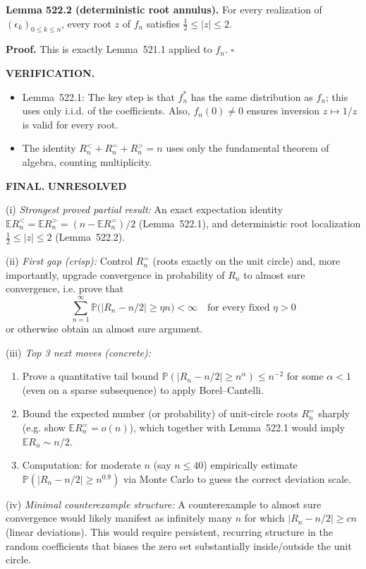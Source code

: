 \medskip
\noindent\textbf{Lemma 522.2 (deterministic root annulus).}
For every realization of $(\epsilon_k)_{0\le k\le n}$, every root $z$ of $f_n$ satisfies $\tfrac12\le |z|\le 2$.

\noindent\textbf{Proof.}
This is exactly Lemma~521.1 applied to $f_n$.
\hfill$\square$

\bigskip
\noindent\textbf{VERIFICATION.}
\begin{itemize}
\item Lemma~522.1: The key step is that $f_n^*$ has the same distribution as $f_n$; this uses only i.i.d. of the coefficients. Also, $f_n(0)\ne 0$ ensures inversion $z\mapsto 1/z$ is valid for every root.
\item The identity $R_n^{<}+R_n^{=}+R_n^{>}=n$ uses only the fundamental theorem of algebra, counting multiplicity.
\end{itemize}

\bigskip
\noindent\textbf{FINAL.} \textbf{UNRESOLVED}

(i) \emph{Strongest proved partial result:}
An exact expectation identity $\mathbb E R_n^{<}=\mathbb E R_n^{>}=(n-\mathbb E R_n^{=})/2$ (Lemma~522.1), and deterministic root localization $\tfrac12\le |z|\le 2$ (Lemma~522.2).

(ii) \emph{First gap (crisp):}
Control $R_n^{=}$ (roots exactly on the unit circle) and, more importantly, upgrade convergence in probability of $R_n$ to almost sure convergence, i.e. prove that
\[\sum_{n=1}^\infty \mathbb P\big(|R_n-n/2|\ge \eta n\big)<\infty\quad\text{for every fixed }\eta>0
\]
or otherwise obtain an almost sure argument.

(iii) \emph{Top 3 next moves (concrete):}
\begin{enumerate}
\item Prove a quantitative tail bound $\mathbb P(|R_n-n/2|\ge n^{\alpha})\le n^{-2}$ for some $\alpha<1$ (even on a sparse subsequence) to apply Borel--Cantelli.
\item Bound the expected number (or probability) of unit-circle roots $R_n^{=}$ sharply (e.g. show $\mathbb E R_n^{=} = o(n)$), which together with Lemma~522.1 would imply $\mathbb E R_n\sim n/2$.
\item Computation: for moderate $n$ (say $n\le 40$) empirically estimate $\mathbb P(|R_n-n/2|\ge n^{0.9})$ via Monte Carlo to guess the correct deviation scale.
\end{enumerate}

(iv) \emph{Minimal counterexample structure:}
A counterexample to almost sure convergence would likely manifest as infinitely many $n$ for which $|R_n-n/2|\ge c n$ (linear deviations). This would require persistent, recurring structure in the random coefficients that biases the zero set substantially inside/outside the unit circle.




